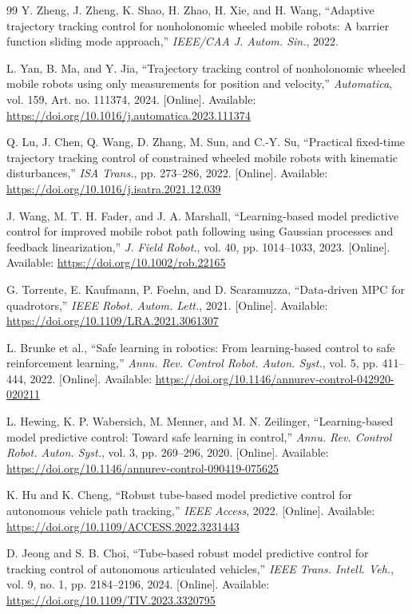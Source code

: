 \begin{thebibliography}{99}
Y. Zheng, J. Zheng, K. Shao, H. Zhao, H. Xie, and H. Wang, ``Adaptive trajectory tracking control for nonholonomic wheeled mobile robots: A barrier function sliding mode approach,'' \emph{IEEE/CAA J. Autom. Sin.}, 2022.

L. Yan, B. Ma, and Y. Jia, ``Trajectory tracking control of nonholonomic wheeled mobile robots using only measurements for position and velocity,'' \emph{Automatica}, vol. 159, Art. no. 111374, 2024. [Online]. Available: \url{https://doi.org/10.1016/j.automatica.2023.111374}

Q. Lu, J. Chen, Q. Wang, D. Zhang, M. Sun, and C.-Y. Su, ``Practical fixed-time trajectory tracking control of constrained wheeled mobile robots with kinematic disturbances,'' \emph{ISA Trans.}, pp. 273--286, 2022. [Online]. Available: \url{https://doi.org/10.1016/j.isatra.2021.12.039}

J. Wang, M. T. H. Fader, and J. A. Marshall, ``Learning-based model predictive control for improved mobile robot path following using Gaussian processes and feedback linearization,'' \emph{J. Field Robot.}, vol. 40, pp. 1014--1033, 2023. [Online]. Available: \url{https://doi.org/10.1002/rob.22165}

G. Torrente, E. Kaufmann, P. Foehn, and D. Scaramuzza, ``Data-driven MPC for quadrotors,'' \emph{IEEE Robot. Autom. Lett.}, 2021. [Online]. Available: \url{https://doi.org/10.1109/LRA.2021.3061307}

L. Brunke et al., ``Safe learning in robotics: From learning-based control to safe reinforcement learning,'' \emph{Annu. Rev. Control Robot. Auton. Syst.}, vol. 5, pp. 411--444, 2022. [Online]. Available: \url{https://doi.org/10.1146/annurev-control-042920-020211}

L. Hewing, K. P. Wabersich, M. Menner, and M. N. Zeilinger, ``Learning-based model predictive control: Toward safe learning in control,'' \emph{Annu. Rev. Control Robot. Auton. Syst.}, vol. 3, pp. 269--296, 2020. [Online]. Available: \url{https://doi.org/10.1146/annurev-control-090419-075625}

K. Hu and K. Cheng, ``Robust tube-based model predictive control for autonomous vehicle path tracking,'' \emph{IEEE Access}, 2022. [Online]. Available: \url{https://doi.org/10.1109/ACCESS.2022.3231443}

D. Jeong and S. B. Choi, ``Tube-based robust model predictive control for tracking control of autonomous articulated vehicles,'' \emph{IEEE Trans. Intell. Veh.}, vol. 9, no. 1, pp. 2184--2196, 2024. [Online]. Available: \url{https://doi.org/10.1109/TIV.2023.3320795}


\end{thebibliography}
